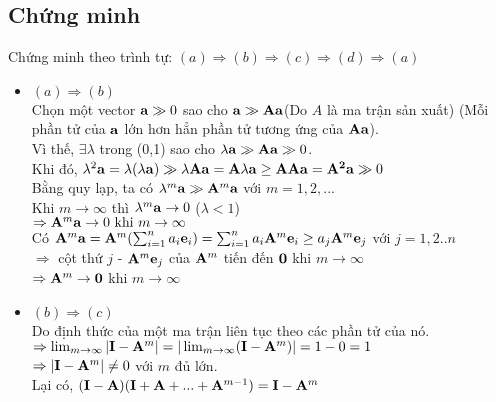 \documentclass[12pt]{article}
\begin{document}
            \subsection{Chứng minh}
                Chứng minh theo trình tự: $(a) \Rightarrow (b) \Rightarrow (c) \Rightarrow (d) \Rightarrow (a)$
                \begin{itemize}
                    \item $(a) \Rightarrow (b)$\\
                        Chọn một vector ${\bf a} \gg 0$ sao cho ${\bf a} \gg {\bf Aa}$(Do $A$ là ma trận sản xuất) (Mỗi phần tử của ${\bf a}$ lớn hơn hẳn phần tử tương ứng của ${\bf Aa}$).\\ 
                        Vì thế, $\exists \lambda$ trong (0,1) sao cho $\lambda{\bf a} \gg {\bf Aa} \gg 0$.\\
                        Khi đó, $\lambda^2{\bf a} = \lambda(\lambda{\bf a}) \gg \lambda{\bf Aa} = {\bf A} \lambda {\bf a} \geq {\bf AAa} = {\bf A^2a}\gg 0$\\
                        Bằng quy lạp, ta có $\lambda^m {\bf a} \gg {\bf A}^m{\bf a} $ với $m = 1,2,...$\\
                        Khi $m \to \infty$ thì $\lambda^m {\bf a} \to 0$ ($\lambda < 1$)\\
                        $\Rightarrow {\bf A}^m{\bf a} \to 0 \text{ khi } m \to \infty$ \\
                        Có ${\bf A}^m{\bf a} = {\bf A}^m (\sum_{i=1}^n a_i {\bf e}_i) = \sum_{i=1}^n a_i {\bf A}^m {\bf e}_i \geq a_j {\bf A}^m {\bf e}_j $ với $j = 1,2..n$\\
                        $\Rightarrow$ cột thứ $j$ -  ${\bf A}^m {\bf e}_j$  của ${\bf A}^m$ tiến đến ${\bf 0}$ khi $m \to \infty$\\
                        $\Rightarrow {\bf A}^m \to {\bf 0}$ khi $m \to \infty$
                    \item $(b) \Rightarrow (c)$\\
                        Do định thức của một ma trận liên tục theo các phần tử của nó.\\
                        $\Rightarrow \lim_{m \to \infty} |{\bf I} - {\bf A}^m| = |\lim_{m \to \infty} ({\bf I} - {\bf A}^m)| = 1 - 0 = 1  $\\
                        $\Rightarrow |{\bf I} - {\bf A}^m| \neq 0$ với $m$ đủ lớn.\\
                        Lại có, $({\bf I - A})({\bf I + A} + ... + {\bf A}^{m-1}) = {\bf I} - {\bf A}^m$\\

\end{itemize}
\end{document}
